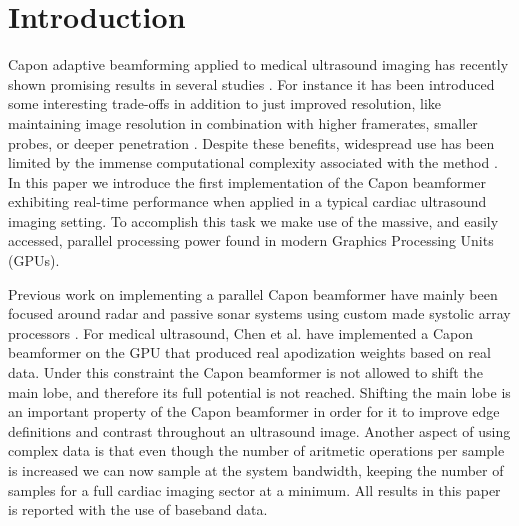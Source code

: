 \documentclass[conference]{IEEEtran}
\begin{document}
\section{Introduction}
Capon adaptive beamforming \cite{Capon1969} applied to medical ultrasound imaging has recently shown promising results in several studies \cite{Synnevag2007, Austeng2008, Vignon2008, Viola, Mehdizadeh2012}. For instance it has been introduced some interesting trade-offs in addition to just improved resolution, like maintaining image resolution in combination with higher framerates, smaller probes, or deeper penetration \cite{Synnevag2009}. Despite these benefits, widespread use has been limited by the immense computational complexity associated with the method \cite{So2011}.  In this paper we introduce the first implementation of the Capon beamformer exhibiting real-time performance when applied in a typical cardiac ultrasound imaging setting. To accomplish this task we make use of the massive, and easily accessed, parallel processing power found in modern Graphics Processing Units (GPUs). 

Previous work on implementing a parallel Capon beamformer have mainly been focused around radar and passive sonar systems using custom made systolic array processors \cite{McWhirter1989, Sinha2002}. For medical ultrasound, Chen et al. \cite{Chen2011a, Chen2011} have implemented a Capon beamformer on the GPU that produced real apodization weights based on real data. Under this constraint the Capon beamformer is not allowed to shift the main lobe, and therefore its full potential is not reached. Shifting the main lobe is an important property of the Capon beamformer in order for it to improve edge definitions and contrast throughout an ultrasound image. Another aspect of using complex data is that even though the number of aritmetic operations per sample is increased we can now sample at the system bandwidth, keeping the number of samples for a full cardiac imaging sector at a minimum. All results in this paper is reported with the use of baseband data.

\end{document}
